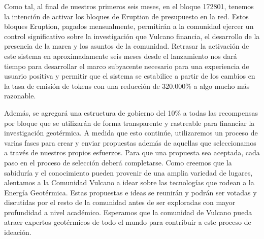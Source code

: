 \documentclass[A4paper, 12pt]{article}
\begin{document}
Como tal, al final de nuestros primeros seis meses, en el bloque 172801, tenemos la intención de activar los bloques de Eruption de presupuesto en la red. Estos bloques Eruption, pagados mensualmente, permitirán a la comunidad ejercer un control significativo sobre la investigación que Vulcano financia, el desarrollo de la presencia de la marca y los asuntos de la comunidad.  Retrasar la activación de este sistema en aproximadamente seis meses desde el lanzamiento nos dará tiempo para desarrollar el marco subyacente necesario para una experiencia de usuario positiva y permitir que el sistema se estabilice a partir de los cambios en la tasa de emisión de tokens con una reducción de 320.000\% a algo mucho más razonable.

Además, se agregará una estructura de gobierno del 10\% a todas las recompensas por bloque que se utilizarán de forma transparente y rastreable para financiar la investigación geotérmica. A medida que esto continúe, utilizaremos un proceso de varias fases para crear y enviar propuestas además de aquellas que seleccionamos a través de nuestros propios esfuerzos.  Para que una propuesta sea aceptada, cada paso en el proceso de selección deberá completarse.  Como creemos que la sabiduría y el conocimiento pueden provenir de una amplia variedad de lugares, alentamos a la Comunidad Vulcano a idear sobre las tecnologías que rodean a la Energía Geotérmica. Estas propuestas e ideas se reunirán y podrán ser votadas y discutidas por el resto de la comunidad antes de ser exploradas con mayor profundidad a nivel académico. Esperamos que la comunidad de Vulcano pueda atraer expertos geotérmicos de todo el mundo para contribuir a este proceso de ideación.
\end{document}
